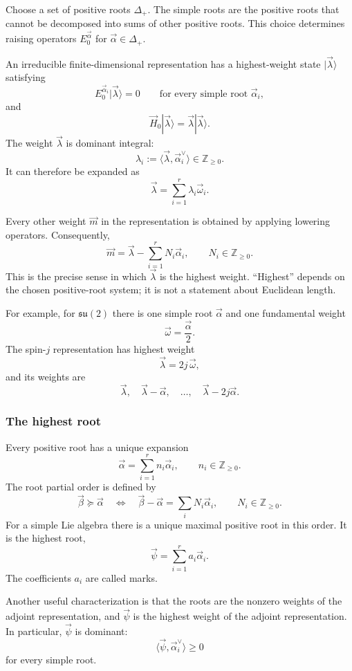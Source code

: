 \documentclass[
  10pt,
  a4paper,
  openany]{book}
\begin{document}
Choose a set of positive roots \(\Delta_+\). The simple roots are the
positive roots that cannot be decomposed into sums of other positive
roots. This choice determines raising operators \(E_0^{\vec\alpha}\) for
\(\vec\alpha\in\Delta_+\).

An irreducible finite-dimensional representation has a highest-weight
state \(|\vec\lambda\rangle\) satisfying \[
E_0^{\vec\alpha_i}|\vec\lambda\rangle=0
\qquad
\text{for every simple root }\vec\alpha_i,
\] and \[
\vec H_0|\vec\lambda\rangle
=\vec\lambda|\vec\lambda\rangle.
\] The weight \(\vec\lambda\) is dominant integral: \[
\lambda_i
:=\langle\vec\lambda,\vec\alpha_i^{\vee}\rangle
\in\mathbb Z_{\geq0}.
\] It can therefore be expanded as \[
\vec\lambda=\sum_{i=1}^r\lambda_i\vec\omega_i.
\]

Every other weight \(\vec m\) in the representation is obtained by
applying lowering operators. Consequently, \[
\vec m
=\vec\lambda-\sum_{i=1}^r N_i\vec\alpha_i,
\qquad
N_i\in\mathbb Z_{\geq0}.
\] This is the precise sense in which \(\vec\lambda\) is the highest
weight. ``Highest'' depends on the chosen positive-root system; it is
not a statement about Euclidean length.

For example, for \(\mathfrak{su}(2)\) there is one simple root
\(\vec\alpha\) and one fundamental weight \[
\vec\omega=\frac{\vec\alpha}{2}.
\] The spin-\(j\) representation has highest weight \[
\vec\lambda=2j\,\vec\omega,
\] and its weights are \[
\vec\lambda,
\quad
\vec\lambda-\vec\alpha,
\quad
\ldots,
\quad
\vec\lambda-2j\vec\alpha.
\]

\subsubsection{The highest root}\label{the-highest-root}

Every positive root has a unique expansion \[
\vec\alpha=\sum_{i=1}^r n_i\vec\alpha_i,
\qquad
n_i\in\mathbb Z_{\geq0}.
\] The root partial order is defined by \[
\vec\beta\succeq\vec\alpha
\quad\Longleftrightarrow\quad
\vec\beta-\vec\alpha
=\sum_i N_i\vec\alpha_i,
\qquad
N_i\in\mathbb Z_{\geq0}.
\] For a simple Lie algebra there is a unique maximal positive root in
this order. It is the highest root, \[
\vec\psi=\sum_{i=1}^r a_i\vec\alpha_i.
\] The coefficients \(a_i\) are called marks.

Another useful characterization is that the roots are the nonzero
weights of the adjoint representation, and \(\vec\psi\) is the highest
weight of the adjoint representation. In particular, \(\vec\psi\) is
dominant: \[
\langle\vec\psi,\vec\alpha_i^{\vee}\rangle\geq0
\] for every simple root.
\end{document}
